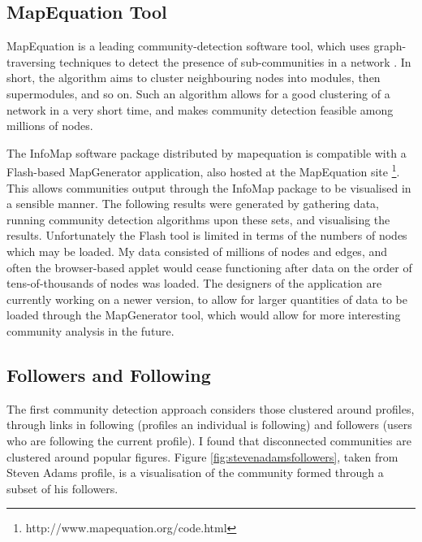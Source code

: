 \subsection{MapEquation Tool}

MapEquation is a leading community-detection software tool, which uses graph-traversing techniques to detect the presence of sub-communities in a network \cite{mapequation}. In short, the algorithm aims to cluster neighbouring nodes into modules, then supermodules, and so on. Such an algorithm allows for a good clustering of a network in a very short time, and makes community detection feasible among millions of nodes.

The InfoMap software package distributed by mapequation is compatible with a Flash-based MapGenerator application, also hosted at the MapEquation site \footnote{http://www.mapequation.org/code.html}. This allows communities output through the InfoMap package to be visualised in a sensible manner. The following results were generated by gathering data, running community detection algorithms upon these sets, and visualising the results. Unfortunately the Flash tool is limited in terms of the numbers of nodes which may be loaded. My data consisted of millions of nodes and edges, and often the browser-based applet would cease functioning after data on the order of tens-of-thousands of nodes was loaded. The designers of the application are currently working on a newer version, to allow for larger quantities of data to be loaded through the MapGenerator tool, which would allow for more interesting community analysis in the future. 

\subsection{Followers and Following}

The first community detection approach considers those clustered around profiles, through links in following (profiles an individual is following) and followers (users who are following the current profile). I found that disconnected communities are clustered around popular figures. Figure \ref{fig:stevenadamsfollowers}, taken from Steven Adams profile, is a visualisation of the community formed through a subset of his followers. 

